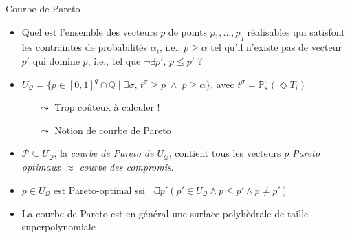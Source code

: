 \documentclass[compress]{beamer}
\theoremstyle{theorem}%
\begin{document}
\begin{frame}{Courbe de Pareto}
  \small
  \begin{itemize}
    \item Quel est l'ensemble des vecteurs $p$ de {\color{fibeamer@orange}points $p_1, \dots, p_q$ réalisables} qui satisfont les contraintes de probabilités $\alpha_i$, i.e., $p \geq \alpha$ {\color{fibeamer@orange}tel qu'il n'existe pas de vecteur $p'$ qui domine $p$}, i.e., tel que $\neg {\exists} p', \, p \leq p'$ ?
    \item $U_\mathcal{Q} = \{ p \in [0, 1]^q \cap \mathbb{Q} \; | \; \exists \sigma, \, t^\sigma \geq p \; \wedge \; p \geq \alpha \}$, avec $t^\sigma = \mathbb{P}_s^\sigma(\Diamond T_i)$
    \begin{itemize}
      \item[$\leadsto$] Trop coûteux à calculer !
      \item[$\leadsto$] Notion de courbe de Pareto
    \end{itemize}
    \item $\mathcal{P} \subseteq U_\mathcal{Q}$, la \textit{\color{fibeamer@orange}courbe de Pareto de $U_\mathcal{Q}$}, contient tous les vecteurs $p$ \textit{\color{fibeamer@orange}Pareto optimaux} $\approx$ \textit{courbe des compromis}.
    \item $p \in U_\mathcal{Q}$ est Pareto-optimal ssi $\neg \exists p' (p'\in U_\mathcal{Q} \wedge p \leq p' \wedge p \neq p')$
    \item La courbe de Pareto est en général une surface polyhèdrale de taille superpolynomiale
  \end{itemize}
\end{frame}
\end{document}
